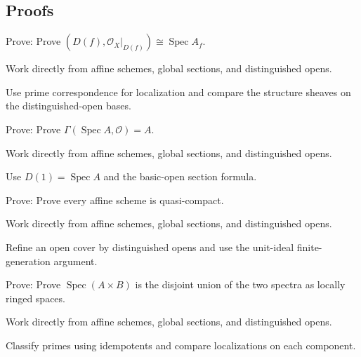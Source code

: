 \subsection*{Proofs}

\begin{exercise}\label{exr:vi18-expand-06}
Prove: Prove $(D(f),\mathcal O_X|_{D(f)})\cong\operatorname{Spec}A_f$.
\end{exercise}
\begin{hint}
Work directly from affine schemes, global sections, and distinguished opens.
\end{hint}
\begin{solution}
Use prime correspondence for localization and compare the structure sheaves on the distinguished-open bases.
\end{solution}

\begin{exercise}\label{exr:vi18-expand-07}
Prove: Prove $\Gamma(\operatorname{Spec}A,\mathcal O)=A$.
\end{exercise}
\begin{hint}
Work directly from affine schemes, global sections, and distinguished opens.
\end{hint}
\begin{solution}
Use $D(1)=\operatorname{Spec}A$ and the basic-open section formula.
\end{solution}

\begin{exercise}\label{exr:vi18-expand-08}
Prove: Prove every affine scheme is quasi-compact.
\end{exercise}
\begin{hint}
Work directly from affine schemes, global sections, and distinguished opens.
\end{hint}
\begin{solution}
Refine an open cover by distinguished opens and use the unit-ideal finite-generation argument.
\end{solution}

\begin{exercise}\label{exr:vi18-expand-09}
Prove: Prove $\operatorname{Spec}(A\times B)$ is the disjoint union of the two spectra as locally ringed spaces.
\end{exercise}
\begin{hint}
Work directly from affine schemes, global sections, and distinguished opens.
\end{hint}
\begin{solution}
Classify primes using idempotents and compare localizations on each component.
\end{solution}

